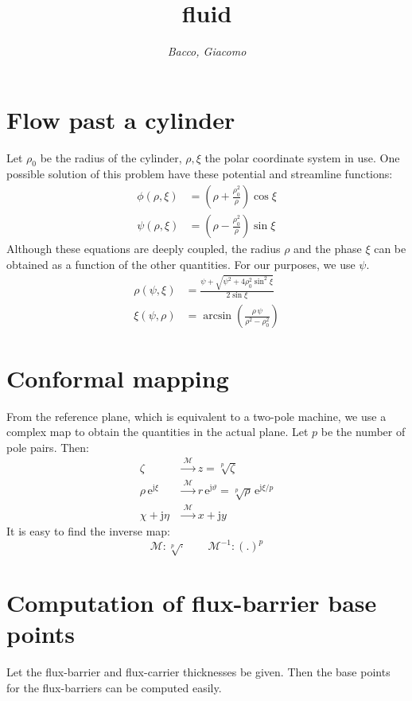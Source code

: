 \documentclass[b5paper,11pt,oneside,fleqn]{article}
\title{\raggedleft\sffamily\Huge fluid}
\author{\sffamily\itshape Bacco, Giacomo}
\date{}
\newcommand{\eu}{\mathrm{e}}
\newcommand{\je}{\mathrm{j}}
\begin{document}
\maketitle

\section{Flow past a cylinder}

Let $ \rho_0 $ be the radius of the cylinder, $ \rho,\xi $ the polar coordinate 
system in use.
One possible solution of this problem have these potential and streamline 
functions:
\begin{align}
\phi(\rho,\xi) &= \left( \rho + \frac{\rho_0^2}{\rho} \right) \cos\xi \\[1ex]
\psi(\rho,\xi) &= \left( \rho - \frac{\rho_0^2}{\rho} \right) \sin\xi 
\end{align}
Although these equations are deeply coupled, the radius $ \rho $ and the phase 
$ \xi $ can be obtained as a function of the other quantities.
For our purposes, we use $ \psi $.
\begin{align}
\rho(\psi,\xi) &= \frac{\psi + \sqrt{\psi^2 + 4\rho_0^2 \sin^2\xi}}{2\sin\xi} 
\\[1ex]
\xi(\psi,\rho) &= \arcsin \left( \frac{\rho\, \psi}{\rho^2 - \rho_0^2} \right)  
\end{align}



\section{Conformal mapping}
From the reference plane, which is equivalent to a two-pole machine,
we use a complex map to obtain the quantities in the actual plane.
Let $ p $ be the number of pole pairs. Then:
\begin{equation}
\begin{aligned}
\zeta              &\xrightarrow{\;\mathcal{M}\;} z = \sqrt[p]{\zeta} \\
\rho\,\eu^{\je\xi} &\xrightarrow{\;\mathcal{M}\;}
                       r \, \eu^{\je\vartheta} = \sqrt[p]{\rho}\,\eu^{\je 
                       \xi/p} \\
\chi + \je\eta     &\xrightarrow{\;\mathcal{M}\;} x + \je y 
\end{aligned}
\end{equation}
%
It is easy to find the inverse map:
\begin{equation}
\mathcal{M}\colon \sqrt[p]{\cdot} \qquad 
\mathcal{M}^{-1}\colon (.)^p
\end{equation}



\section{Computation of flux-barrier base points}
Let the flux-barrier and flux-carrier thicknesses be given.
Then the base points for the flux-barriers can be computed easily.
\end{document}

